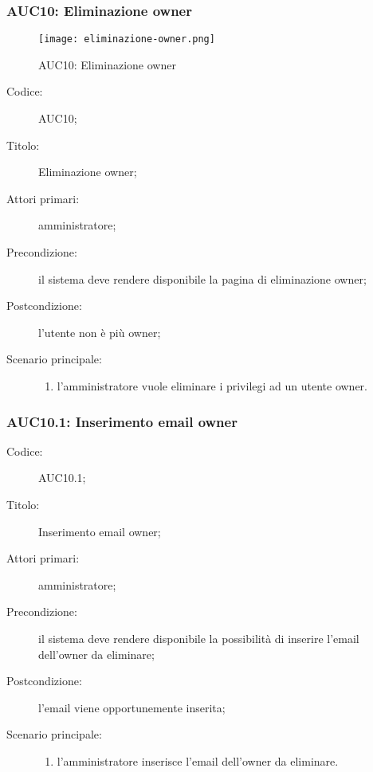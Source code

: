 \documentclass[../../../analisi-dei-requisiti.tex]{subfiles}
\begin{document}
\subsubsection{AUC10: Eliminazione owner}%
\label{subs:AUC10}

\begin{figure}[H]
  \centering
  \texttt{[image: eliminazione-owner.png]}
  \caption{AUC10: Eliminazione owner}%
  \label{fig:AUC10}
\end{figure}

\begin{description}
  \item[Codice:] AUC10;
  \item[Titolo:] Eliminazione owner;
  \item[Attori primari:] amministratore;
  \item[Precondizione:] il sistema deve rendere disponibile la pagina di eliminazione owner;
  \item[Postcondizione:] l'utente non è più owner;
  \item[Scenario principale:]
  \begin{enumerate}
    \item l'amministratore vuole eliminare i privilegi ad un utente owner.
  \end{enumerate}
\end{description}

\subsubsection{AUC10.1: Inserimento email owner}%
\label{subs:AUC10.1}
\begin{description}
  \item[Codice:] AUC10.1;
  \item[Titolo:] Inserimento email owner;
  \item[Attori primari:] amministratore;
  \item[Precondizione:] il sistema deve rendere disponibile la possibilità di inserire l'email dell'owner da eliminare;
  \item[Postcondizione:] l'email viene opportunemente inserita;
  \item[Scenario principale:]
  \begin{enumerate}
    \item l'amministratore inserisce l'email dell'owner da eliminare.
  \end{enumerate}
\end{description}
\end{document}
